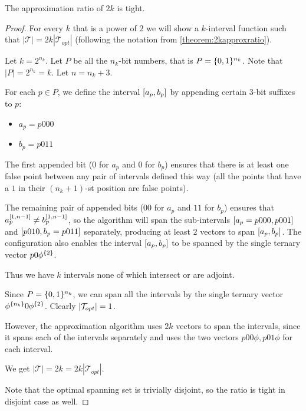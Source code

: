\begin{theorem}
\label{theorem:2kapproxtight}
The approximation ratio of $2k$ is tight.
\end{theorem}

\begin{proof}
For every $k$ that is a power of $2$
we will show a $k$-interval function such that
$|\mathcal{T}| = 2k |\mathcal{T}_{opt}|$
(following the notation from
\cref{theorem:2kapproxratio}).

Let $k = 2^{n_k}$.
Let $P$ be all the $n_k$-bit numbers,
that is $P = \{0, 1\}^{n_k}$.
Note that $|P| = 2^{n_k} = k$.
Let $n = n_k + 3$.

For each $p \in P$,
we define the interval $[a_p, b_p]$
by appending certain $3$-bit suffixes to $p$:

\begin{itemize}
\item $a_p = p 000$
\item $b_p = p 011$
\end{itemize}

The first appended bit
($0$ for $a_p$ and $0$ for $b_p$)
ensures that there is at least one false point
between any pair of intervals defined this way
(all the points that have a $1$ in their $(n_k + 1)$-st
position are false points).

The remaining pair of appended bits
($00$ for $a_p$ and $11$ for $b_p$)
ensures that
$a_p^{[1, n-1]} \neq b_p^{[1, n-1]}$,
so the algorithm will span the sub-intervals
$[a_p = p 000, p 001]$
and $[p 010, b_p = p 011]$ separately,
producing at least $2$ vectors to span
$[a_p, b_p]$.
The configuration also enables
the interval $[a_p, b_p]$
to be spanned by the single ternary vector
$p 0 \phi^{\{2\}}$.

Thus we have $k$ intervals
none of which intersect or are adjoint.

Since $P = \{0, 1\}^{n_k}$,
we can span all the intervals by the single ternary vector
$\phi^{\{n_k\}} 0 \phi^{\{2\}}$.
Clearly $\lvert\mathcal{T}_{opt}\rvert = 1$.

However,
the approximation algorithm uses $2k$ vectors to span
the intervals,
since it spans each of the intervals separately
and uses the two vectors
$p 0 0 \phi, p 0 1 \phi$
for each interval.

We get
$|\mathcal{T}| = 2k = 2k |\mathcal{T}_{opt}|$.

Note that the optimal spanning set is trivially disjoint,
so the ratio is tight in disjoint case as well.
\end{proof}
